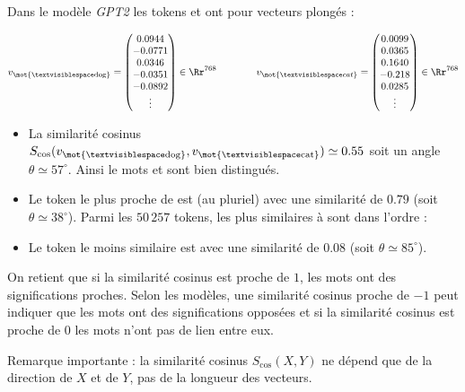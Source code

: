 \documentclass[11pt,class=report,crop=false]{standalone}
\begin{document}
\begin{exemple}
Dans le modèle \emph{GPT2} les tokens  et  ont pour vecteurs plongés :

$$v_{\text{\mot{␣dog}}} = \begin{pmatrix}
	 0.0944 \\
	 -0.0771 \\
	 0.0346 \\
	 -0.0351 \\
	 -0.0892 \\ 
     \vdots \\
     \end{pmatrix} \in \Rr^{768}
\qquad \qquad
v_{\mot{␣cat}} = \begin{pmatrix}
	0.0099 \\
	0.0365 \\
	0.1640 \\
	-0.218 \\
	0.0285 \\
	\vdots
\end{pmatrix} \in \Rr^{768}
$$
\begin{itemize}
	\item La similarité cosinus 
$S_{\cos} (v_{\text{\mot{␣dog}}}, v_{\text{\mot{␣cat}}} ) \simeq 0.55$
soit un angle $\theta \simeq 57^\circ$. Ainsi le mots  et  sont bien distingués.
    \item Le token le plus proche de  est  (au pluriel) avec une similarité de $0.79$ (soit $\theta \simeq 38^\circ$). Parmi les $50\,257$ tokens, les plus similaires à  sont dans l'ordre :
    \item Le token le moins similaire est  avec une similarité de $0.08$ (soit $\theta \simeq 85^\circ$).
\end{itemize} 
\end{exemple}

On retient que si la similarité cosinus est proche de $1$, les mots ont des significations proches. Selon les modèles, une similarité cosinus proche de $-1$ peut indiquer que les mots ont des significations opposées et si la similarité cosinus est proche de $0$ les mots n'ont pas de lien entre eux.

\smallskip

Remarque importante : la similarité cosinus $S_{\cos}(X,Y)$ ne dépend que de la direction de $X$ et de $Y$, pas de la longueur des vecteurs.
\end{document}
